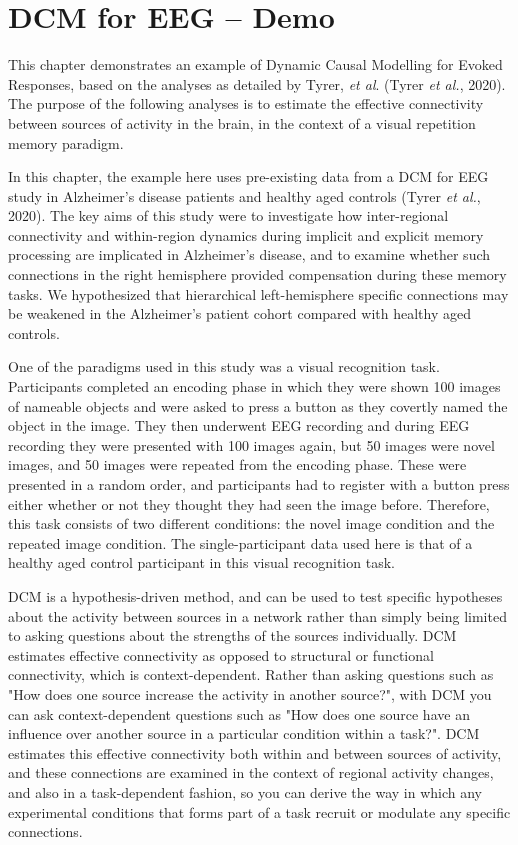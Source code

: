 \chapter{DCM for EEG -- Demo \label{Chap:DCM_ERP}}

This chapter demonstrates an example of Dynamic Causal Modelling for
Evoked Responses, based on the analyses as detailed by Tyrer, \emph{et
al}. (Tyrer \emph{et al.}, 2020). The purpose of the following analyses
is to estimate the effective connectivity between sources of activity in
the brain, in the context of a visual repetition memory paradigm.

In this chapter, the example here uses pre-existing data from a DCM for
EEG study in Alzheimer's disease patients and healthy aged controls
(Tyrer \emph{et al.}, 2020). The key aims of this study were to
investigate how inter-regional connectivity and within-region dynamics
during implicit and explicit memory processing are implicated in
Alzheimer's disease, and to examine whether such connections in the
right hemisphere provided compensation during these memory tasks. We
hypothesized that hierarchical left-hemisphere specific connections may
be weakened in the Alzheimer's patient cohort compared with healthy aged
controls.

One of the paradigms used in this study was a visual recognition task.
Participants completed an encoding phase in which they were shown 100
images of nameable objects and were asked to press a button as they
covertly named the object in the image. They then underwent EEG
recording and during EEG recording they were presented with 100 images
again, but 50 images were novel images, and 50 images were repeated from
the encoding phase. These were presented in a random order, and
participants had to register with a button press either whether or not
they thought they had seen the image before. Therefore, this task
consists of two different conditions: the novel image condition and the
repeated image condition. The single-participant data used here is that
of a healthy aged control participant in this visual recognition task.

DCM is a hypothesis-driven method, and can be used to test specific
hypotheses about the activity between sources in a network rather than
simply being limited to asking questions about the strengths of the
sources individually. DCM estimates effective connectivity as opposed to
structural or functional connectivity, which is context-dependent.
Rather than asking questions such as "How does one source increase the
activity in another source?", with DCM you can ask context-dependent
questions such as "How does one source have an influence over another
source in a particular condition within a task?". DCM estimates this
effective connectivity both within and between sources of activity, and
these connections are examined in the context of regional activity
changes, and also in a task-dependent fashion, so you can derive the way
in which any experimental conditions that forms part of a task recruit
or modulate any specific connections.

